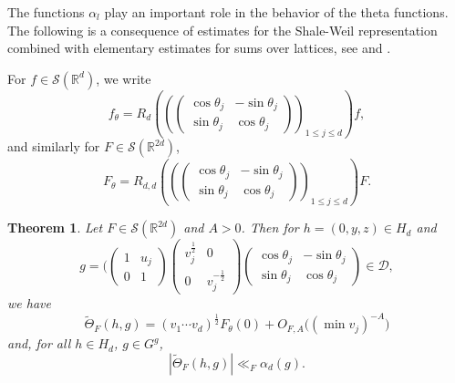 \documentclass[12pt]{amsart}
\newtheorem{thm}{Theorem}[section]
\theoremstyle{definition}
\theoremstyle{remark}
\numberwithin{equation}{section}
\newcommand{\R}{\mathbb{R}}
\newcommand{\cD}{\mathcal{D}}
\newcommand{\cS}{\mathcal{S}}
\begin{document}
The functions $\alpha_l$ play an important role in the behavior of the theta functions.
The following is a consequence of estimates for the Shale-Weil representation combined with elementary estimates for sums over lattices, see \cite[Theorem~4.4]{MarklofWelsh2021a} and \cite{Marklof2003}.

For $f\in\cS(\R^d)$, we write
  \begin{equation}
    \label{eq:ftheta}
    f_\theta = R_d\left(\left(
    \begin{pmatrix}
      \cos \theta_j & -\sin \theta_j \\
      \sin \theta_j & \cos \theta_j
    \end{pmatrix}
   \right)_{\!\!1\leq j\leq d}\right)f ,
  \end{equation}
and similarly for $F\in\cS(\R^{2d})$,
  \begin{equation}
    \label{eq:fthetadd}
    F_\theta = R_{d,d}\left(\left(
    \begin{pmatrix}
      \cos \theta_j & -\sin \theta_j \\
      \sin \theta_j & \cos \theta_j
    \end{pmatrix}
   \right)_{\!\!1\leq j\leq d}\right) F.
  \end{equation}

\begin{thm}
  \label{thm:thetaasymptotic}
  Let $F\in\cS(\R^{2d})$ and $A > 0$. Then for $h=(0,y,z)\in H_d$ and
  $$g
  = (
  \begin{pmatrix}
    1 & u_j \\
    0 & 1
  \end{pmatrix}
  \begin{pmatrix}
    v_j^{\frac{1}{2}} & 0 \\
    0 & v_j^{-\frac{1}{2}}
  \end{pmatrix}
  \begin{pmatrix}
    \cos \theta_j & -\sin \theta_j \\
    \sin \theta_j & \cos \theta_j
  \end{pmatrix}
  \in\cD,$$ we have
  \begin{equation}
    \label{eq:thetaasymp}
    \widetilde\Theta_F(h, g) = (v_1 \cdots v_d)^{\frac{1}{2}} F_\theta(0) + O_{F,A}\big((\min v_j)^{-A}\big) 
  \end{equation}
  and, for all $h\in H_d$, $g\in G^g$,
 \begin{equation}
    \label{eq:thetaasymp123}
    |\widetilde\Theta_F(h, g)|  \ll_F \alpha_d(g).
  \end{equation}
\end{thm}
\end{document}

